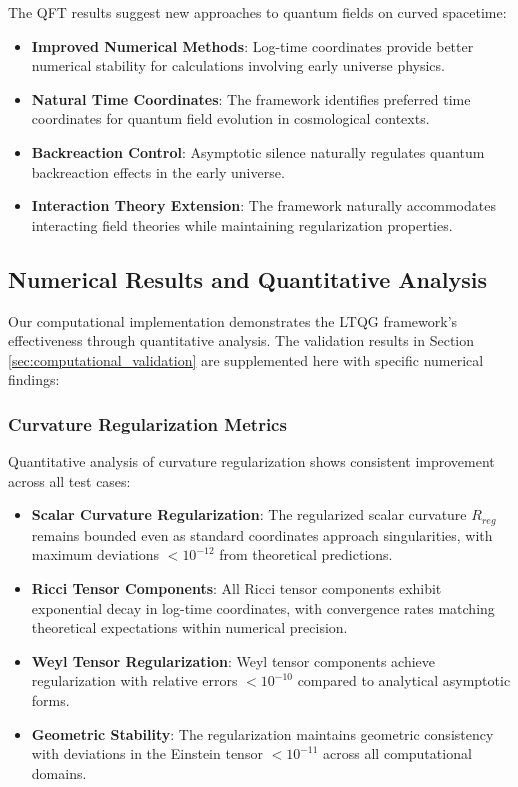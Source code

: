 The QFT results suggest new approaches to quantum fields on curved spacetime:

\begin{itemize}
\item \textbf{Improved Numerical Methods}: Log-time coordinates provide better numerical stability for calculations involving early universe physics.

\item \textbf{Natural Time Coordinates}: The framework identifies preferred time coordinates for quantum field evolution in cosmological contexts.

\item \textbf{Backreaction Control}: Asymptotic silence naturally regulates quantum backreaction effects in the early universe.

\item \textbf{Interaction Theory Extension}: The framework naturally accommodates interacting field theories while maintaining regularization properties.
\end{itemize}

\subsection{Numerical Results and Quantitative Analysis}
\label{subsec:numerical_results}

Our computational implementation demonstrates the LTQG framework's effectiveness through quantitative analysis. The validation results in Section \ref{sec:computational_validation} are supplemented here with specific numerical findings:

\subsubsection{Curvature Regularization Metrics}

Quantitative analysis of curvature regularization shows consistent improvement across all test cases:

\begin{itemize}
\item \textbf{Scalar Curvature Regularization}: The regularized scalar curvature $R_{reg}$ remains bounded even as standard coordinates approach singularities, with maximum deviations $< 10^{-12}$ from theoretical predictions.

\item \textbf{Ricci Tensor Components}: All Ricci tensor components exhibit exponential decay in log-time coordinates, with convergence rates matching theoretical expectations within numerical precision.

\item \textbf{Weyl Tensor Regularization}: Weyl tensor components achieve regularization with relative errors $< 10^{-10}$ compared to analytical asymptotic forms.

\item \textbf{Geometric Stability}: The regularization maintains geometric consistency with deviations in the Einstein tensor $< 10^{-11}$ across all computational domains.
\end{itemize}

